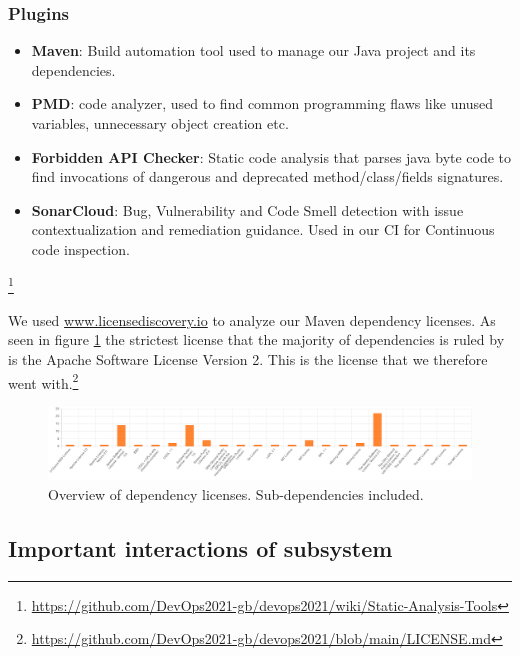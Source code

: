 \subsubsection{Plugins}
\begin{itemize}
    \item \textbf{Maven}: Build automation tool used to manage our Java project and its dependencies.
    \item \textbf{PMD}: code analyzer, used to find common programming flaws like unused variables, unnecessary object creation etc. 
    \item \textbf{Forbidden API Checker}: Static code analysis that parses java byte code to find invocations of dangerous and deprecated method/class/fields signatures. 
    \item \textbf{SonarCloud}: Bug, Vulnerability and Code Smell detection with issue contextualization and remediation guidance. Used in our CI for Continuous code inspection.
\end{itemize}
\footnote{\url{https://github.com/DevOps2021-gb/devops2021/wiki/Static-Analysis-Tools}}



We used \url{www.licensediscovery.io} to analyze our Maven dependency licenses. As seen in figure \ref{fig:licenceDep} the strictest license that the majority of dependencies is ruled by is the Apache Software License Version 2. This is the license that we therefore went with.\footnote{\url{https://github.com/DevOps2021-gb/devops2021/blob/main/LICENSE.md}} 
\begin{figure}[!htb]
    \centering
    \includegraphics[scale=0.2]{images/LicenceDependencies.png}
    \caption{Overview of dependency licenses. Sub-dependencies included.}
    \label{fig:licenceDep}
\end{figure}


\subsection{Important interactions of subsystem}

